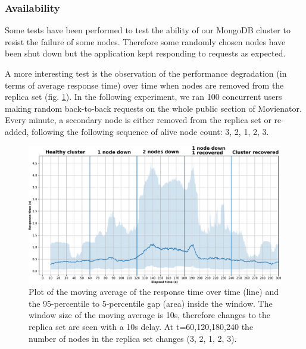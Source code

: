 \documentclass[11pt]{article}
\begin{document}
\subsubsection{Availability}
Some tests have been performed to test the ability of our MongoDB cluster to resist the failure of some nodes. Therefore some randomly chosen nodes have 
been shut down but the application kept responding to requests as expected. 

A more interesting test is the observation of the performance degradation (in terms of average response time) over time when nodes are removed from the replica set (fig. \ref{fig:crash_test}). In the following experiment, we ran 100 concurrent users making random back-to-back requests on the whole public section of Movienator. Every minute, a secondary node is either removed from the replica set or re-added, following the following sequence of alive node count: 3, 2, 1, 2, 3. 

\begin{figure}[]
	\centering
	\includegraphics[width=\textwidth]{figs/crash_test.pdf}
	\caption{Plot of the moving average of the response time over time (line) and the 95-percentile to 5-percentile gap (area) inside the window. The window size of the moving average is 10s, therefore changes to the replica set are seen with a 10s delay. At t={60,120,180,240} the number of nodes in the replica set changes (3, 2, 1, 2, 3).}
	\label{fig:crash_test}
\end{figure}
\end{document}
